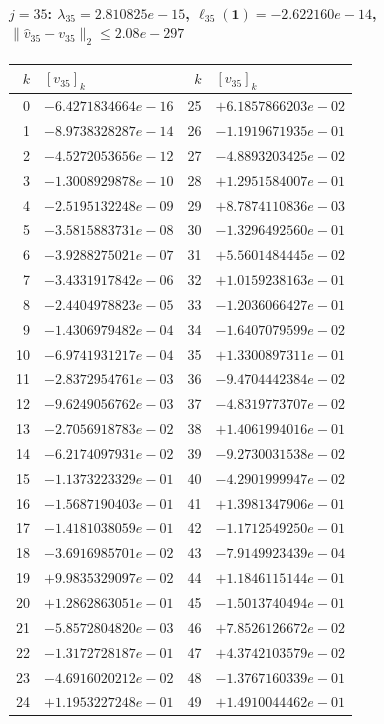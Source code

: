 \paragraph{$j = 35$: $\lambda_{35} = 2.810825e-15$, \quad $\ell_{35}(\mathbf{1}) = -2.622160e-14$, \quad $\|\hat{v}_{35} - v_{35}\|_2 \leq 2.08e-297$}
\begin{center}
{\footnotesize
\begin{tabular}{r@{\;\;}l@{\quad}r@{\;\;}l}
\toprule
$k$ & $[v_{35}]_k$ & $k$ & $[v_{35}]_k$ \\
\midrule
0 & $-6.4271834664e-16$ & 25 & $+6.1857866203e-02$ \\
1 & $-8.9738328287e-14$ & 26 & $-1.1919671935e-01$ \\
2 & $-4.5272053656e-12$ & 27 & $-4.8893203425e-02$ \\
3 & $-1.3008929878e-10$ & 28 & $+1.2951584007e-01$ \\
4 & $-2.5195132248e-09$ & 29 & $+8.7874110836e-03$ \\
5 & $-3.5815883731e-08$ & 30 & $-1.3296492560e-01$ \\
6 & $-3.9288275021e-07$ & 31 & $+5.5601484445e-02$ \\
7 & $-3.4331917842e-06$ & 32 & $+1.0159238163e-01$ \\
8 & $-2.4404978823e-05$ & 33 & $-1.2036066427e-01$ \\
9 & $-1.4306979482e-04$ & 34 & $-1.6407079599e-02$ \\
10 & $-6.9741931217e-04$ & 35 & $+1.3300897311e-01$ \\
11 & $-2.8372954761e-03$ & 36 & $-9.4704442384e-02$ \\
12 & $-9.6249056762e-03$ & 37 & $-4.8319773707e-02$ \\
13 & $-2.7056918783e-02$ & 38 & $+1.4061994016e-01$ \\
14 & $-6.2174097931e-02$ & 39 & $-9.2730031538e-02$ \\
15 & $-1.1373223329e-01$ & 40 & $-4.2901999947e-02$ \\
16 & $-1.5687190403e-01$ & 41 & $+1.3981347906e-01$ \\
17 & $-1.4181038059e-01$ & 42 & $-1.1712549250e-01$ \\
18 & $-3.6916985701e-02$ & 43 & $-7.9149923439e-04$ \\
19 & $+9.9835329097e-02$ & 44 & $+1.1846115144e-01$ \\
20 & $+1.2862863051e-01$ & 45 & $-1.5013740494e-01$ \\
21 & $-5.8572804820e-03$ & 46 & $+7.8526126672e-02$ \\
22 & $-1.3172728187e-01$ & 47 & $+4.3742103579e-02$ \\
23 & $-4.6916020212e-02$ & 48 & $-1.3767160339e-01$ \\
24 & $+1.1953227248e-01$ & 49 & $+1.4910044462e-01$ \\
\bottomrule
\end{tabular}
}
\end{center}


